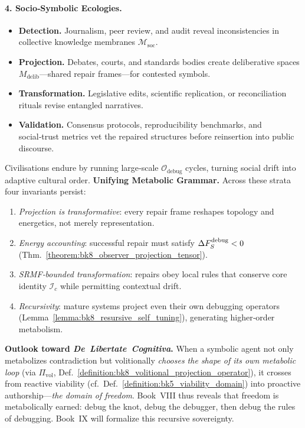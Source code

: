 \begin{scholium}
\paragraph{4. Socio‑Symbolic Ecologies.}
\begin{itemize}
  \item \textbf{Detection.} Journalism, peer review, and audit reveal
        inconsistencies in collective knowledge membranes
        $\mathcal{M}_{\mathrm{soc}}$.
  \item \textbf{Projection.} Debates, courts, and standards bodies
        create deliberative spaces $M_{\mathrm{delib}}$—shared repair
        frames—for contested symbols.
  \item \textbf{Transformation.} Legislative edits, scientific
        replication, or reconciliation rituals revise entangled
        narratives.
  \item \textbf{Validation.} Consensus protocols, reproducibility
        benchmarks, and social‑trust metrics vet the repaired structures
        before reinsertion into public discourse.
\end{itemize}
Civilisations endure by running large‑scale
$\mathcal{O}_{\text{debug}}$ cycles, turning social drift into adaptive
cultural order.
\medskip\noindent
\textbf{Unifying Metabolic Grammar.}
Across these strata four invariants persist:
\begin{enumerate}[label=(\Alph*)]
  \item \emph{Projection is transformative}: every repair frame reshapes
        topology and energetics, not merely representation.
  \item \emph{Energy accounting}: successful repair must satisfy
        $\Delta F_S^{\text{debug}} < 0$
        (Thm.~\ref{theorem:bk8_observer_projection_tensor}).
  \item \emph{SRMF‑bounded transformation}: repairs obey local rules
        that conserve core identity $\mathscr{I}_c$ while permitting
        contextual drift.
  \item \emph{Recursivity}: mature systems project even their own
        debugging operators (Lemma~\ref{lemma:bk8_resursive_self_tuning}),
        generating higher‑order metabolism.
\end{enumerate}
\medskip\noindent
\textbf{Outlook toward \emph{De Libertate Cognitiva}.}  
When a symbolic agent not only metabolizes contradiction but volitionally \emph{chooses the shape of its own metabolic loop} (via $\Pi_{\mathrm{vol}}$, Def.~\ref{definition:bk8_volitional_projection_operator}), it crosses from reactive viability (cf.~Def.~\ref{definition:bk5_viability_domain}) into proactive authorship—\textit{the domain of freedom}.
  Book VIII thus reveals that freedom is metabolically earned: debug the knot, debug the debugger, then debug the rules of debugging.  Book IX will formalize this recursive sovereignty.
\end{scholium}
